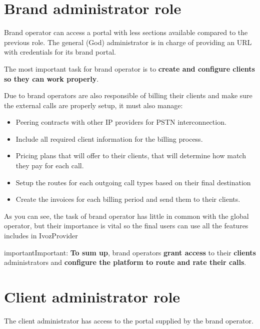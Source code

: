 \documentclass[letterpaper,10pt,english]{sphinxmanual}
\begin{document}
\section{Brand administrator role}
\label{basic_concepts/operation_roles/index:brand-administrator-role}
Brand operator can access a portal with less sections available compared
to the previous role. The general (God) administrator is in charge of
providing an URL with credentials for its brand portal.

The most important task for brand operator is to \textbf{create and configure
clients so they can work properly}.

Due to brand operators are also responsible of billing their clients and
make sure the external calls are properly setup, it must also manage:
\begin{itemize}
\item {} 
Peering contracts with other IP providers for PSTN interconnection.

\item {} 
Include all required client information for the billing process.

\item {} 
Pricing plans that will offer to their clients, that will determine how
match they pay for each call.

\item {} 
Setup the routes for each outgoing call types based on their final
destination

\item {} 
Create the invoices for each billing period and send them to their
clients.

\end{itemize}

As you can see, the task of brand operator has little in common with the
global operator, but their importance is vital so the final users can use
all the features includes in IvozProvider
\label{basic_concepts/operation_roles/index:brand-responsibilities}
\begin{notice}{important}{Important:}
\textbf{To sum up}, brand operators \textbf{grant access} to their
\textbf{clients} administrators and \textbf{configure the platform
to route and rate their calls}.
\end{notice}


\section{Client administrator role}
\label{basic_concepts/operation_roles/index:client-administrator-role}
The client administrator has access to the portal supplied by the brand
operator.
\end{document}
